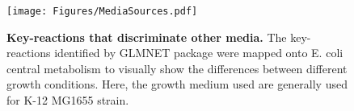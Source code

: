 \documentclass[12pt]{article}
\begin{document}
\begin{figure}[!ht]
\begin{center}
\hspace*{-3.5cm}
\texttt{[image: Figures/MediaSources.pdf]}
\end{center}
\caption{
{\bf Key-reactions that discriminate other media.}  The key-reactions identified by GLMNET package were mapped onto E. coli central metabolism to visually show the differences between different growth conditions. Here, the growth medium used are generally used for K-12 MG1655 strain.
}
\label{Figure_label}
\end{figure}
\end{document}
